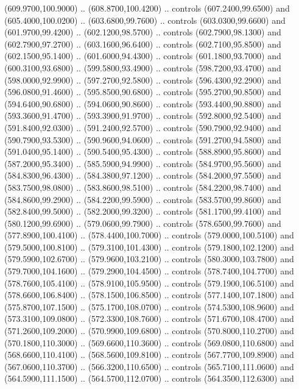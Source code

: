 {\begin{scope}[y=0.80pt, x=0.80pt, yscale=-1, xscale=1, inner sep=0pt, outer sep=0pt, #1]
      (609.9700,100.9000) .. (608.8700,100.4200) .. controls (607.2400,99.6500) and
      (605.4000,100.0200) .. (603.6800,99.7600) .. controls (603.0300,99.6600) and
      (601.9700,99.4200) .. (602.1200,98.5700) .. controls (602.7900,98.1300) and
      (602.7900,97.2700) .. (603.1600,96.6400) .. controls (602.7100,95.8500) and
      (602.1500,95.1400) .. (601.6000,94.4300) .. controls (601.1800,93.7000) and
      (600.3100,93.6800) .. (599.5800,93.4900) .. controls (598.7200,93.4700) and
      (598.0000,92.9900) .. (597.2700,92.5800) .. controls (596.4300,92.2900) and
      (596.0800,91.4600) .. (595.8500,90.6800) .. controls (595.2700,90.8500) and
      (594.6400,90.6800) .. (594.0600,90.8600) .. controls (593.4400,90.8800) and
      (593.3600,91.4700) .. (593.3900,91.9700) .. controls (592.8000,92.5400) and
      (591.8400,92.0300) .. (591.2400,92.5700) .. controls (590.7900,92.9400) and
      (590.7900,93.5300) .. (590.9600,94.0600) .. controls (591.2700,94.5800) and
      (591.0400,95.1400) .. (590.5400,95.4300) .. controls (588.8900,95.8600) and
      (587.2000,95.3400) .. (585.5900,94.9900) .. controls (584.9700,95.5600) and
      (584.8300,96.4300) .. (584.3800,97.1200) .. controls (584.2000,97.5500) and
      (583.7500,98.0800) .. (583.8600,98.5100) .. controls (584.2200,98.7400) and
      (584.8600,99.2900) .. (584.2200,99.5900) .. controls (583.5700,99.8600) and
      (582.8400,99.5000) .. (582.2000,99.3200) .. controls (581.1700,99.4100) and
      (580.1200,99.6900) .. (579.0600,99.7900) .. controls (578.6500,99.7600) and
      (577.8900,100.4100) .. (578.4400,100.7000) .. controls (579.0000,100.5100) and
      (579.5000,100.8100) .. (579.3100,101.4300) .. controls (579.1800,102.1200) and
      (579.5900,102.6700) .. (579.9600,103.2100) .. controls (580.3000,103.7800) and
      (579.7000,104.1600) .. (579.2900,104.4500) .. controls (578.7400,104.7700) and
      (578.7600,105.4100) .. (578.9100,105.9500) .. controls (579.1900,106.5100) and
      (578.6600,106.8400) .. (578.1500,106.8500) .. controls (577.1400,107.1800) and
      (575.8700,107.1500) .. (575.1700,108.0700) .. controls (574.5300,108.9600) and
      (573.3100,109.0800) .. (572.3300,108.7600) .. controls (571.6700,108.4700) and
      (571.2600,109.2000) .. (570.9900,109.6800) .. controls (570.8000,110.2700) and
      (570.1800,110.3000) .. (569.6600,110.3600) .. controls (569.0800,110.6800) and
      (568.6600,110.4100) .. (568.5600,109.8100) .. controls (567.7700,109.8900) and
      (567.0600,110.3700) .. (566.3200,110.6500) .. controls (565.7100,111.0600) and
      (564.5900,111.1500) .. (564.5700,112.0700) .. controls (564.3500,112.6300) and

\end{scope}}
